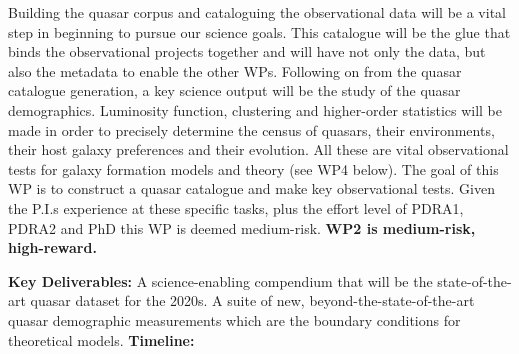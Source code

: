 \smallskip
\smallskip
\noindent
Building the quasar corpus and cataloguing the observational data will
be a vital step in beginning to pursue our science goals. This
catalogue will be the glue that binds the observational projects
together and will have not only the data, but also the metadata to
enable the other WPs.  Following on from the quasar catalogue
generation, a key science output will be the study of the quasar
demographics.  Luminosity function, clustering and higher-order
statistics will be made in order to precisely determine the census of
quasars, their environments, their host galaxy preferences and their
evolution. All these are vital observational tests for galaxy
formation models and theory (see WP4 below). The goal of this WP is to
construct a quasar catalogue and make key observational tests.
Given the P.I.s experience at these specific tasks, plus the effort
level of PDRA1, PDRA2 and PhD this WP is deemed medium-risk.
{\bf WP2 is medium-risk, high-reward.}  

\smallskip
\smallskip
\noindent
{\bf Key Deliverables:} A science-enabling compendium that will be the state-of-the-art quasar
dataset for the 2020s.  A suite of new, beyond-the-state-of-the-art
quasar demographic measurements which are the boundary conditions for
theoretical models. {\bf Timeline:} 


